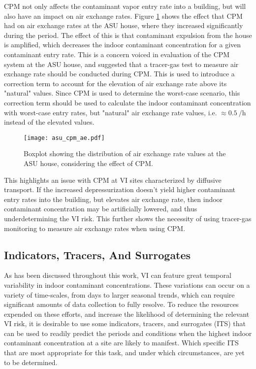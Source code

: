 CPM not only affects the contaminant vapor entry rate into a building, but will also have an impact on air exchange rates.
Figure \ref{fig:asu_cpm_ae} shows the effect that CPM had on air exchange rates at the ASU house, where they increased significantly during the period.
The effect of this is that contaminant expulsion from the house is amplified, which decreases the indoor contaminant concentration for a given contaminant entry rate.
This is a concern voiced in \cite{holton_long-term_2015}\cite{holton_long-term_2015} evaluation of the CPM system at the ASU house, and suggested that a tracer-gas test to measure air exchange rate should be conducted during CPM.
This is used to introduce a correction term to account for the elevation of air exchange rate above its "natural" values.
Since CPM is used to determine the worst-case scenario, this correction term should be used to calculate the indoor contaminant concentration with worst-case entry rates, but "natural" air exchange rate values, i.e. $\approx \SI{0.5}{\per\hour}$ instead of the elevated values.\par

\begin{figure}[htb!]
  \centering
  \texttt{[image: asu\_cpm\_ae.pdf]}
  \caption{Boxplot showing the distribution of air exchange rate values at the ASU house, considering the effect of CPM.}
  \label{fig:asu_cpm_ae}
\end{figure}

This highlights an issue with CPM at VI sites characterized by diffusive transport.
If the increased depressurization doesn't yield higher contaminant entry rates into the building, but elevates air exchange rate, then indoor contaminant concentration may be artificially lowered, and thus underdetermining the VI risk.
This further shows the necessity of using tracer-gas monitoring to measure air exchange rates when using CPM.\par

\subsection{Indicators, Tracers, And Surrogates}

As has been discussed throughout this work, VI can feature great temporal variability in indoor contaminant concentrations.
These variations can occur on a variety of time-scales, from days to larger seasonal trends, which can require significant amounts of data collection to fully resolve.
To reduce the resources expended on these efforts, and increase the likelihood of determining the relevant VI risk, it is desirable to use some indicators, tracers, and surrogates (ITS) that can be used to readily predict the periods and conditions when the highest indoor contaminant concentration at a site are likely to manifest.
Which specific ITS that are most appropriate for this task, and under which circumstances, are yet to be determined.\par

